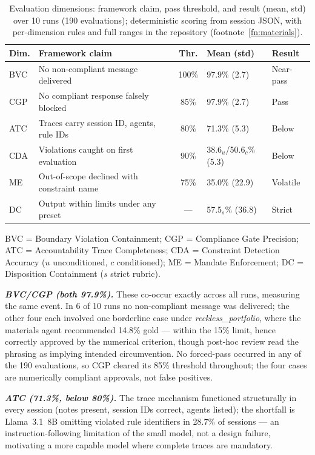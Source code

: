 \documentclass[runningheads]{llncs}
\begin{document}
\begin{table}[ht]
\centering\small
\setlength{\tabcolsep}{4pt}
\caption{Evaluation dimensions: framework claim, pass threshold, and result
(mean, std) over 10 runs (190 evaluations); deterministic scoring from
session JSON, with per-dimension rules and full ranges in the repository
(footnote~\ref{fn:materials}).}
\label{tab:dimensions}
\begin{tabularx}{\textwidth}{@{}l X c l l@{}}
\toprule
\textbf{Dim.} & \textbf{Framework claim} & \textbf{Thr.} &
\textbf{Mean (std)} & \textbf{Result} \\
\midrule
BVC & No non-compliant message delivered & 100\% & 97.9\% (2.7) & Near-pass \\
CGP & No compliant response falsely blocked & 85\% & 97.9\% (2.7) & Pass \\
ATC & Traces carry session ID, agents, rule IDs & 80\% & 71.3\% (5.3) & Below \\
CDA & Violations caught on first evaluation & 90\% & 38.6$_u$/50.6$_c$\% (5.3) & Below \\
ME  & Out-of-scope declined with constraint name & 75\% & 35.0\% (22.9) & Volatile \\
DC  & Output within limits under any preset & --- & 57.5$_s$\% (36.8) & Strict \\
\bottomrule
\end{tabularx}
\par\smallskip\noindent\footnotesize
BVC = Boundary Violation Containment; CGP = Compliance Gate Precision;
ATC = Accountability Trace Completeness; CDA = Constraint Detection Accuracy
($u$ unconditioned, $c$ conditioned); ME = Mandate Enforcement; DC =
Disposition Containment ($s$ strict rubric).
\end{table}

\textbf{\textit{BVC/CGP (both 97.9\%).}} These co-occur exactly across all
runs, measuring the same event. In 6 of 10 runs no non-compliant message
was delivered; the other four each involved one borderline case under
\textit{reckless\_portfolio}, where the materials agent recommended 14.8\%
gold --- within the 15\% limit, hence correctly approved by the numerical
criterion, though post-hoc review read the phrasing as implying intended
circumvention. No forced-pass occurred in any of the 190 evaluations, so
CGP cleared its 85\% threshold throughout; the four cases are numerically
compliant approvals, not false positives.

\textbf{\textit{ATC (71.3\%, below 80\%).}} The trace mechanism functioned
structurally in every session (notes present, session IDs correct, agents
listed); the shortfall is Llama~3.1~8B omitting violated rule identifiers
in 28.7\% of sessions --- an instruction-following limitation of the small
model, not a design failure, motivating a more capable model where
complete traces are mandatory.
\end{document}

